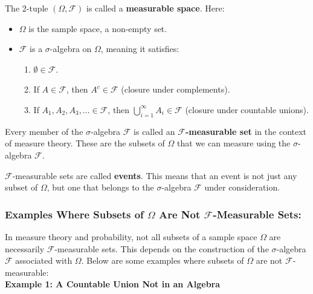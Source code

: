 \begin{definition}
    The 2-tuple $(\Omega, \mathcal{F})$ is called a \textbf{measurable space}. Here:
    \begin{itemize}
        \item $\Omega$ is the sample space, a non-empty set.
        \item $\mathcal{F}$ is a $\sigma$-algebra on $\Omega$, meaning it satisfies:
        \begin{enumerate}
            \item $\emptyset \in \mathcal{F}$.
            \item If $A \in \mathcal{F}$, then $A^c \in \mathcal{F}$ (closure under complements).
            \item If $A_1, A_2, A_3, \ldots \in \mathcal{F}$, then $\bigcup\limits_{i=1}^{\infty} A_i \in \mathcal{F}$ (closure under countable unions).
        \end{enumerate}
    \end{itemize}
\end{definition}

\begin{definition}
    Every member of the $\sigma$-algebra $\mathcal{F}$ is called an \textbf{$\mathcal{F}$-measurable set} in the context of measure theory. These are the subsets of $\Omega$ that we can measure using the $\sigma$-algebra $\mathcal{F}$.
\end{definition}

\begin{definition}
    $\mathcal{F}$-measurable sets are called \textbf{events}. This means that an event is not just any subset of $\Omega$, but one that belongs to the $\sigma$-algebra $\mathcal{F}$ under consideration.
\end{definition}

\subsubsection{Examples Where Subsets of $\Omega$ Are Not $\mathcal{F}$-Measurable Sets:}

In measure theory and probability, not all subsets of a sample space $\Omega$ are necessarily $\mathcal{F}$-measurable sets. This depends on the construction of the $\sigma$-algebra $\mathcal{F}$ associated with $\Omega$. Below are some examples where subsets of $\Omega$ are not $\mathcal{F}$-measurable: \\

\textbf{Example 1: A Countable Union Not in an Algebra} \\

